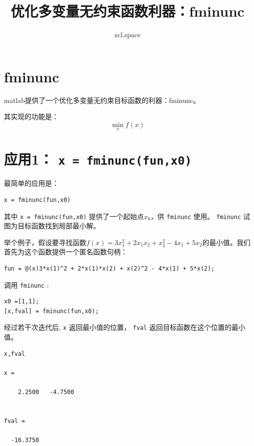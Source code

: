 \documentclass[10pt,a4paper,UTF8]{article}
\author{zcl.space}
\date{}
\title{优化多变量无约束函数利器：fminunc}
\begin{document}
\maketitle
\tableofcontents
{}

\section{fminunc}
\label{sec:org8e95a76}


matlab提供了一个优化多变量无约束目标函数的利器：fminunc。

其实现的功能是：
\begin{equation}
\label{eq:1}
\underset{x}{\min}f(x)
\end{equation}

\section{应用1： \texttt{x = fminunc(fun,x0)}}
\label{sec:orgd12babd}


最简单的应用是：
\lstset{language=matlab,label= ,caption= ,captionpos=b,numbers=none}
\begin{lstlisting}
x = fminunc(fun,x0)
\end{lstlisting}

其中 \texttt{x = fminunc(fun,x0)} 提供了一个起始点\(x_{0}\)，供 \texttt{fminunc} 使用。 \texttt{fminunc} 试图为目标函数找到局部最小解。

举个例子，假设要寻找函数\(f(x) = 3x_{1}^{2} + 2x_{1}x_{2}+ x_{2}^{2} -4x_{1} +5x_{2}\)的最小值。我们首先为这个函数提供一个匿名函数句柄：
\lstset{language=matlab,label= ,caption= ,captionpos=b,numbers=none}
\begin{lstlisting}
fun = @(x)3*x(1)^2 + 2*x(1)*x(2) + x(2)^2 - 4*x(1) + 5*x(2);
\end{lstlisting}
调用 \texttt{fminunc} :
\lstset{language=matlab,label= ,caption= ,captionpos=b,numbers=none}
\begin{lstlisting}
x0 =[1,1];
[x,fval] = fminunc(fun,x0);
\end{lstlisting}
经过若干次迭代后, \texttt{x} 返回最小值的位置， \texttt{fval} 返回目标函数在这个位置的最小值。
\begin{verbatim}
x,fval

x =

    2.2500   -4.7500


fval =

  -16.3750
\end{verbatim}
\end{document}
